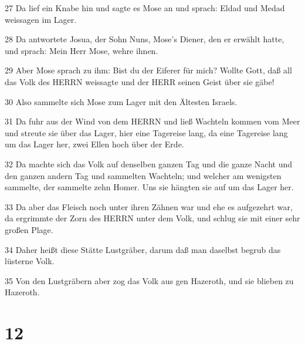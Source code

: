 \par 27 Da lief ein Knabe hin und sagte es Mose an und sprach: Eldad und Medad weissagen im Lager.
\par 28 Da antwortete Josua, der Sohn Nuns, Mose's Diener, den er erwählt hatte, und sprach: Mein Herr Mose, wehre ihnen.
\par 29 Aber Mose sprach zu ihm: Bist du der Eiferer für mich? Wollte Gott, daß all das Volk des HERRN weissagte und der HERR seinen Geist über sie gäbe!
\par 30 Also sammelte sich Mose zum Lager mit den Ältesten Israels.
\par 31 Da fuhr aus der Wind von dem HERRN und ließ Wachteln kommen vom Meer und streute sie über das Lager, hier eine Tagereise lang, da eine Tagereise lang um das Lager her, zwei Ellen hoch über der Erde.
\par 32 Da machte sich das Volk auf denselben ganzen Tag und die ganze Nacht und den ganzen andern Tag und sammelten Wachteln; und welcher am wenigsten sammelte, der sammelte zehn Homer. Uns sie hängten sie auf um das Lager her.
\par 33 Da aber das Fleisch noch unter ihren Zähnen war und ehe es aufgezehrt war, da ergrimmte der Zorn des HERRN unter dem Volk, und schlug sie mit einer sehr großen Plage.
\par 34 Daher heißt diese Stätte Lustgräber, darum daß man daselbst begrub das lüsterne Volk.
\par 35 Von den Lustgräbern aber zog das Volk aus gen Hazeroth, und sie blieben zu Hazeroth.

\chapter{12}

